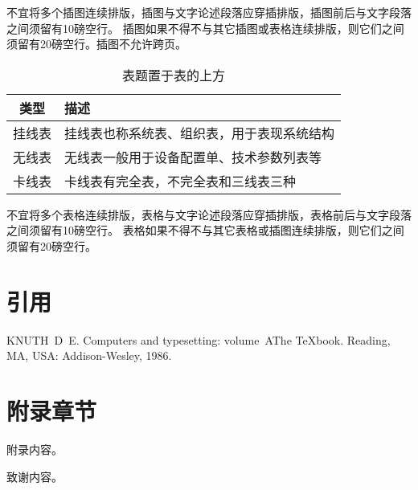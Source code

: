 不宜将多个插图连续排版，插图与文字论述段落应穿插排版，插图前后与文字段落之间须留有10磅空行。
插图如果不得不与其它插图或表格连续排版，则它们之间须留有20磅空行。插图不允许跨页。

\begin{table}[h]
  \centering
  \caption{表题置于表的上方}
  \label{tab:exampletable}
  \begin{tabular}{cl}
    \toprule
    类型   & 描述                                       \\
    \midrule
    挂线表 & 挂线表也称系统表、组织表，用于表现系统结构 \\
    无线表 & 无线表一般用于设备配置单、技术参数列表等   \\
    卡线表 & 卡线表有完全表，不完全表和三线表三种       \\
    \bottomrule
  \end{tabular}
\end{table}

不宜将多个表格连续排版，表格与文字论述段落应穿插排版，表格前后与文字段落之间须留有10磅空行。
表格如果不得不与其它表格或插图连续排版，则它们之间须留有20磅空行。

\chapter{引用}
\cite{knuth86a}

\begin{thebibliography}{1}
KNUTH~D~E.
\newblock Computers and typesetting: volume~A\quad The
  {\TeX}book\allowbreak[M].
\newblock Reading, MA, USA: Addison-Wesley, 1986.
\end{thebibliography}

\appendix
\chapter{附录章节}
附录内容。

\backmatter
\begin{acknowledgements}
  致谢内容。
\end{acknowledgements}
